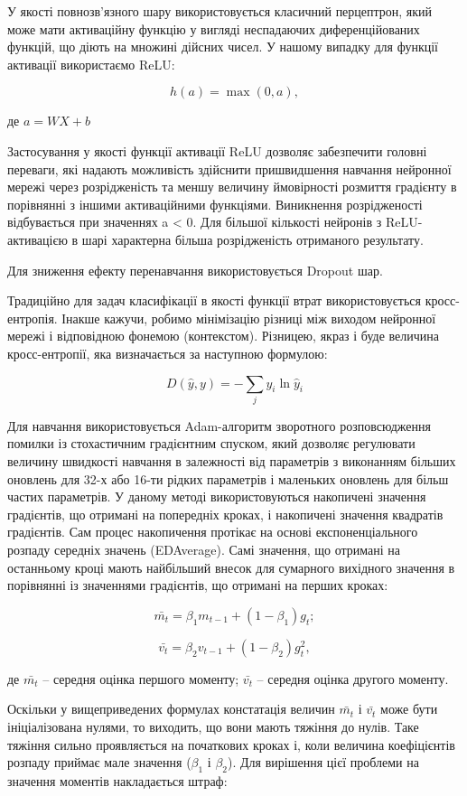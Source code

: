 У якості повнозв’язного шару використовується класичний перцептрон, який може мати активаційну функцію у вигляді неспадаючих диференційованих функцій, що діють на множині дійсних чисел. У нашому випадку для функції активації використаємо ReLU:

\[
h(a) = \max(0, a),
\]

\noindent
де $a=WX+b$

Застосування у якості функції активації ReLU дозволяє забезпечити головні переваги, які надають можливість здійснити пришвидшення навчання нейронної мережі через розрідженість та меншу величину ймовірності розмиття градієнту в порівнянні з іншими активаційними функціями. Виникнення розрідженості відбувається при значеннях a < 0. Для більшої кількості нейронів з ReLU-активацією в шарі характерна більша розрідженість отриманого результату.

Для зниження ефекту перенавчання використовується Dropout шар.

Традиційно для задач класифікації в якості функції втрат використовується кросс-ентропія. Інакше кажучи, робимо мінімізацію різниці між виходом нейронної мережі і відповідною фонемою (контекстом). Різницею, якраз і буде величина кросс-ентропії, яка визначається за наступною формулою:

\[
D(\hat{y},y)=-\sum_j y_i \ln \hat{y}_i
\]

Для навчання використовується Adam-алгоритм зворотного розповсюдження помилки із стохастичним градієнтним спуском, який дозволяє регулювати величину швидкості навчання в залежності від параметрів з виконанням більших оновлень для 32-х або 16-ти рідких параметрів і маленьких оновлень для більш частих параметрів. У даному методі використовуються накопичені значення градієнтів, що отримані на попередніх кроках, і накопичені значення квадратів градієнтів. Сам процес накопичення протікає на основі експоненціального розпаду середніх значень (EDAverage). Самі значення, що отримані на останньому кроці мають найбільший внесок для сумарного вихідного значення в порівнянні із значеннями градієнтів, що отримані на перших кроках:

\[
\bar{m_t}=\beta_1m_{t-1}+(1-\beta_1)g_t;
\]

\[
\bar{v_t}=\beta_2v_{t-1}+(1-\beta_2)g^2_t,
\]

\noindent
де $\bar{m_t}$ – середня оцінка першого моменту; $\bar{v_t}$ – середня оцінка другого моменту.

Оскільки у вищеприведених формулах констатація величин $\bar{m_t}$ і $\bar{v_t}$ може бути ініціалізована нулями, то виходить, що вони мають тяжіння до нулів. Таке тяжіння сильно проявляється на початкових кроках і, коли величина коефіцієнтів розпаду приймає мале значення ($\beta_1$ і $\beta_2$). Для вирішення цієї проблеми на значення моментів накладається штраф:

